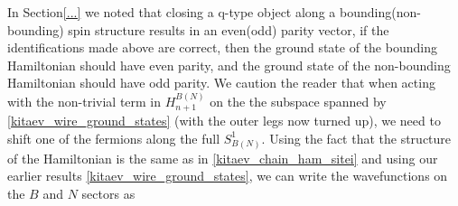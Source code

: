 In Section\ref{...} we noted that closing a q-type object along a bounding(non-bounding) spin structure results in an even(odd) parity vector, if the identifications made above are correct, then the ground state of the bounding Hamiltonian should have even parity, and the ground state of the non-bounding Hamiltonian should have odd parity. 
We caution the reader that when acting with the non-trivial term in $H^{B(N)}_{n+1}$ 
on the the subspace spanned by \eqref{kitaev_wire_ground_states} (with the outer legs now turned up), 
we need to shift one of the fermions along the full $S^1_{B(N)}$.
Using the fact that the structure of the Hamiltonian is the same as in \eqref{kitaev_chain_ham_sitei} and using our earlier results \eqref{kitaev_wire_ground_states}, we can write the wavefunctions on the $B$ and $N$ sectors as 
